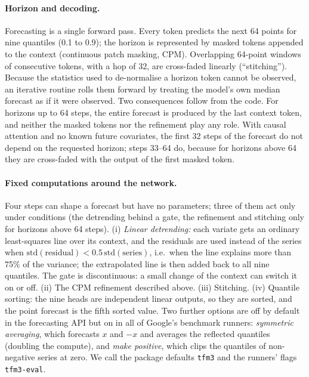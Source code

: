 \paragraph{Horizon and decoding.} Forecasting is a single forward pass. Every token predicts the next 64 points for nine quantiles
(0.1 to 0.9); the horizon is represented by masked tokens appended to the context (continuous patch masking, CPM). Overlapping
64-point windows of consecutive tokens, with a hop of 32, are cross-faded linearly (``stitching''). Because the statistics used to
de-normalise a horizon token cannot be observed, an iterative routine rolls them forward by treating the model's own median forecast
as if it were observed. Two consequences follow from the code. For horizons up to 64 steps, the entire forecast is produced by the
last context token, and neither the masked tokens nor the refinement play any role. With causal attention and no known future
covariates, the first 32 steps of the forecast do not depend on the requested horizon; steps 33--64 do, because for horizons above
64 they are cross-faded with the output of the first masked token.

\paragraph{Fixed computations around the network.} Four steps can shape a forecast but have no parameters; three of them act only under conditions (the detrending behind a gate,
the refinement and stitching only for horizons above 64 steps). (i) \emph{Linear
detrending:} each variate gets an ordinary least-squares line over its context, and the residuals are used instead of the series
when $\mathrm{std}(\text{residual}) < 0.5\,\mathrm{std}(\text{series})$, i.e.\ when the line explains more than 75\% of the
variance; the extrapolated line is then added back to all nine quantiles. The gate is discontinuous: a small change of the context
can switch it on or off. (ii) The CPM refinement described above. (iii) Stitching. (iv) Quantile sorting: the nine heads are
independent linear outputs, so they are sorted, and the point forecast is the fifth sorted value. Two further options are off by
default in the forecasting API but on in all of Google's benchmark runners: \emph{symmetric averaging}, which forecasts $x$ and $-x$
and averages the reflected quantiles (doubling the compute), and \emph{make positive}, which clips the quantiles of non-negative
series at zero. We call the package defaults \texttt{tfm3} and the runners' flags \texttt{tfm3-eval}.

